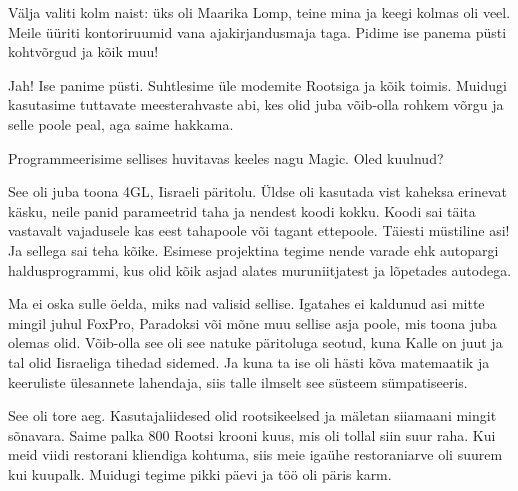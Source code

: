 Välja valiti kolm naist: üks oli Maarika Lomp, teine mina ja keegi kolmas oli veel. Meile 
üüriti kontoriruumid vana ajakirjandusmaja taga. Pidime ise panema 
püsti kohtvõrgud ja kõik muu! 


Jah! Ise panime püsti. Suhtlesime üle modemite Rootsiga ja kõik toimis. Muidugi kasutasime tuttavate meesterahvaste abi, kes olid juba võib-olla rohkem võrgu ja selle poole peal, aga saime hakkama. 

Programmeerisime sellises huvitavas keeles nagu Magic. Oled 
kuulnud? 


See oli juba toona 4GL, Iisraeli päritolu. Üldse 
oli kasutada vist kaheksa erinevat käsku, neile panid 
parameetrid taha ja nendest koodi kokku. Koodi sai täita vastavalt 
vajadusele kas eest tahapoole või tagant ettepoole. Täiesti müstiline asi! Ja 
sellega sai teha kõike. Esimese projektina tegime nende varade ehk 
autopargi haldusprogrammi, kus olid kõik asjad alates muruniitjatest ja lõpetades 
autodega. 


Ma ei oska sulle öelda, miks nad valisid sellise. Igatahes ei kaldunud asi mitte mingil juhul FoxPro, 
Paradoksi või mõne muu sellise asja poole, mis toona juba olemas olid. 
Võib-olla see oli see natuke päritoluga seotud, kuna Kalle on juut ja tal 
olid Iisraeliga tihedad sidemed. Ja kuna ta ise oli hästi kõva matemaatik ja 
keeruliste ülesannete lahendaja, siis talle ilmselt see 
süsteem sümpatiseeris. 

See oli tore aeg. Kasutajaliidesed olid rootsikeelsed ja mäletan siiamaani mingit 
sõnavara. Saime palka 800 Rootsi krooni kuus, mis oli 
tollal siin suur raha. Kui meid viidi restorani kliendiga 
kohtuma, siis meie igaühe restoraniarve oli suurem kui kuupalk. 
Muidugi tegime pikki päevi ja töö oli päris karm. 



